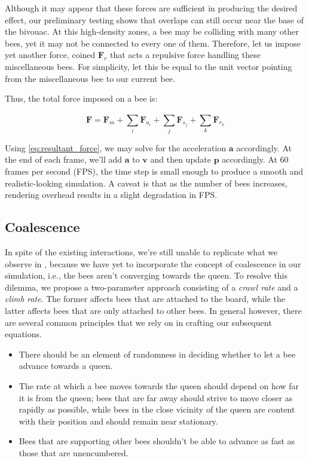 \documentclass[a4paper,11pt]{article}
\begin{document}
Although it may appear that these forces are sufficient
in producing the desired effect, our preliminary testing shows that overlaps can still occur
near the base of the bivouac. At this high-density zones, a bee may be colliding with many
other bees, yet it may not be connected to every one of them. Therefore, let us impose yet
another force, coined $\mathbf{F}_{r}$ that acts a repulsive force handling these miscellaneous
bees. For simplicity, let this be equal to the unit vector pointing from the miscellaneous
bee to our current bee.

Thus, the total force imposed on a bee is:

\begin{equation}
    \label{eq:resultant_force}
    \mathbf{F} = \mathbf{F}_{m} + \sum_{i}^{}\mathbf{F}_{a_{i}} + \sum_{j}^{}\mathbf{F}_{s_{j}} + \sum_{k}^{}\mathbf{F}_{r_{k}}
\end{equation}

Using \eqref{eq:resultant_force}, we may solve for the acceleration $\mathbf{a}$ accordingly.
At the end of each frame, we'll add $\mathbf{a}$ to $\mathbf{v}$ and then update $\mathbf{p}$
accordingly. At $60$ frames per second (FPS), the time step is small enough to produce
a smooth and realistic-looking simulation. A caveat is that as the number of bees
increases, rendering overhead results in a slight degradation in FPS.

\subsection{Coalescence}

In spite of the existing interactions, we're still unable to replicate what we observe
in \cite{peleg2018collective}, because we have yet to incorporate the concept of coalescence
in our simulation, i.e., the bees aren't converging towards the queen. To resolve
this dilemma, we propose a two-parameter approach consisting of a \textit{crawl rate}
and a \textit{climb rate}. The former affects bees that are attached to the board,
while the latter affects bees that are only attached to other bees. In general however,
there are several common principles that we rely on in crafting our subsequent equations.

\begin{itemize}
    \item There should be an element of randomness in deciding whether to let a bee advance
    towards a queen.
    \item The rate at which a bee moves towards the queen should depend on how far it
    is from the queen; bees that are far away should strive to move closer as rapidly
    as possible, while bees in the close vicinity of the queen are content with their
    position and should remain near stationary.
    \item Bees that are supporting other bees shouldn't be able to advance as fast as
    those that are unencumbered.
\end{itemize}
\end{document}
